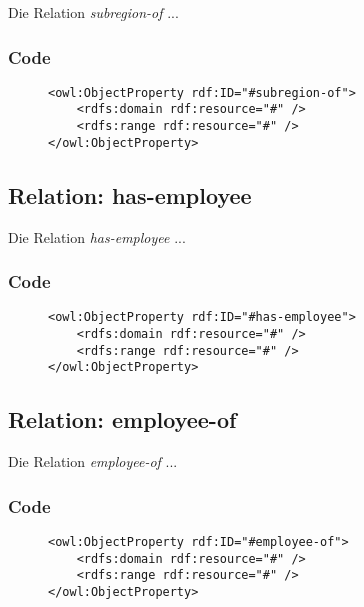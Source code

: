 \documentclass[
    11pt,
    latin1,
    a4paper,
    oneside
]{scrreprt}
\begin{document}
Die Relation \emph{subregion-of} ...

\subsubsection{Code} \label{sec:rel_subregionof_code}

\begin{figure}[h]
 \lstset{language=XML}
 \begin{lstlisting}[label=owl:word]
<owl:ObjectProperty rdf:ID="#subregion-of">
	<rdfs:domain rdf:resource="#" />
	<rdfs:range rdf:resource="#" />
</owl:ObjectProperty>
 \end{lstlisting}
\end{figure}


\subsection{Relation: has-employee} \label{sec:rel_hasemployee}

Die Relation \emph{has-employee} ...

\subsubsection{Code} \label{sec:rel_hasemployee_code}

\begin{figure}[h]
 \lstset{language=XML}
 \begin{lstlisting}[label=owl:word]
<owl:ObjectProperty rdf:ID="#has-employee">
	<rdfs:domain rdf:resource="#" />
	<rdfs:range rdf:resource="#" />
</owl:ObjectProperty>
 \end{lstlisting}
\end{figure}


\subsection{Relation: employee-of} \label{sec:rel_employeeof}

Die Relation \emph{employee-of} ...

\subsubsection{Code} \label{sec:rel_employeeof_code}

\begin{figure}[h]
 \lstset{language=XML}
 \begin{lstlisting}[label=owl:word]
<owl:ObjectProperty rdf:ID="#employee-of">
	<rdfs:domain rdf:resource="#" />
	<rdfs:range rdf:resource="#" />
</owl:ObjectProperty>
 \end{lstlisting}
\end{figure}
\end{document}
